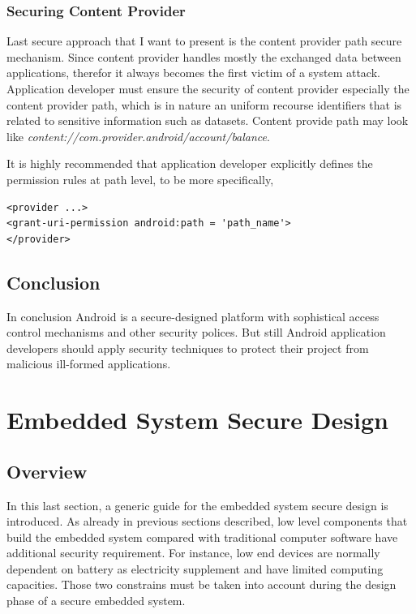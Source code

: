 \subsubsection{Securing Content Provider}
Last secure approach that I want to present is the content provider path  secure mechanism. Since content provider handles mostly the exchanged data between applications, therefor it always becomes the first victim of a system attack. Application developer must ensure the security of content provider especially the content  provider path, which is in nature an uniform recourse identifiers that is related  to sensitive information such as datasets\cite{android_secure_cook}. Content provide path may look like \emph{content://com.provider.android/account/balance}.

It is highly recommended that application developer explicitly defines the permission rules at path level, to be more specifically\cite{android_secure_cook}, 
\begin{Verbatim}[fontsize=\relsize{-1},frame=lines,framesep=4mm, label=\fbox{\small\emph{'Content Path Securing}}]
<provider ...>
<grant-uri-permission android:path = 'path_name'>
</provider>
\end{Verbatim} 
\subsection{Conclusion}
In conclusion Android is  a secure-designed platform with sophistical access control mechanisms and other security polices. But still Android  application developers should apply security techniques to protect their project from malicious ill-formed applications.
\section{Embedded System Secure Design}
\subsection{Overview}
In this last section,  a generic guide for the embedded system secure design is introduced. As already in previous sections described, low level components that build the embedded system compared with traditional  computer software have additional security requirement. For instance, low end devices are normally dependent on battery as electricity supplement and have limited computing capacities. Those two constrains must be taken into account during the design phase of a secure embedded system.
